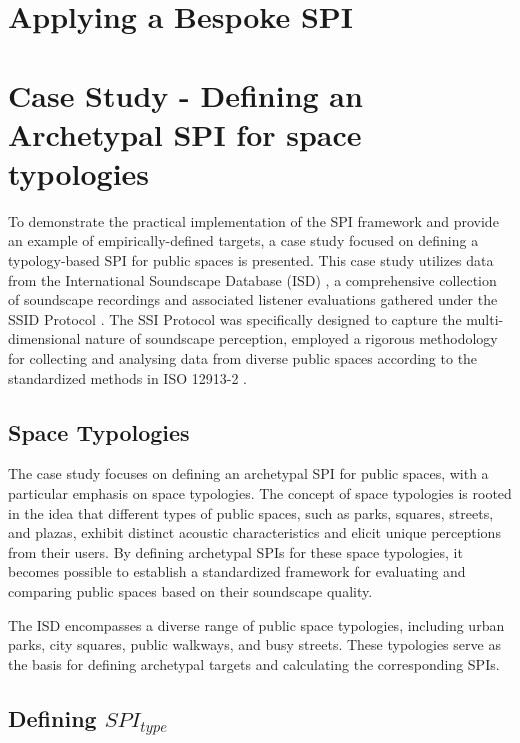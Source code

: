 \documentclass[
  authoryear,
  preprint,
  3p]{elsarticle}
\begin{document}
\section{Applying a Bespoke SPI}\label{applying-a-bespoke-spi}

\section{Case Study - Defining an Archetypal SPI for space
typologies}\label{case-study---defining-an-archetypal-spi-for-space-typologies}

To demonstrate the practical implementation of the SPI framework and
provide an example of empirically-defined targets, a case study focused
on defining a typology-based SPI for public spaces is presented. This
case study utilizes data from the International Soundscape Database
(ISD) \citep{Mitchell2021International}, a comprehensive collection of
soundscape recordings and associated listener evaluations gathered under
the SSID Protocol \citep{Mitchell2020Soundscape}. The SSI Protocol was
specifically designed to capture the multi-dimensional nature of
soundscape perception, employed a rigorous methodology for collecting
and analysing data from diverse public spaces according to the
standardized methods in ISO 12913-2 \citep{ISO12913Part2}.

\subsection{Space Typologies}\label{space-typologies}

The case study focuses on defining an archetypal SPI for public spaces,
with a particular emphasis on space typologies. The concept of space
typologies is rooted in the idea that different types of public spaces,
such as parks, squares, streets, and plazas, exhibit distinct acoustic
characteristics and elicit unique perceptions from their users. By
defining archetypal SPIs for these space typologies, it becomes possible
to establish a standardized framework for evaluating and comparing
public spaces based on their soundscape quality.

The ISD encompasses a diverse range of public space typologies,
including urban parks, city squares, public walkways, and busy streets.
These typologies serve as the basis for defining archetypal targets and
calculating the corresponding SPIs.

\subsection{\texorpdfstring{Defining
\(SPI_{type}\)}{Defining SPI\_\{type\}}}\label{defining-spi_type}
\end{document}
